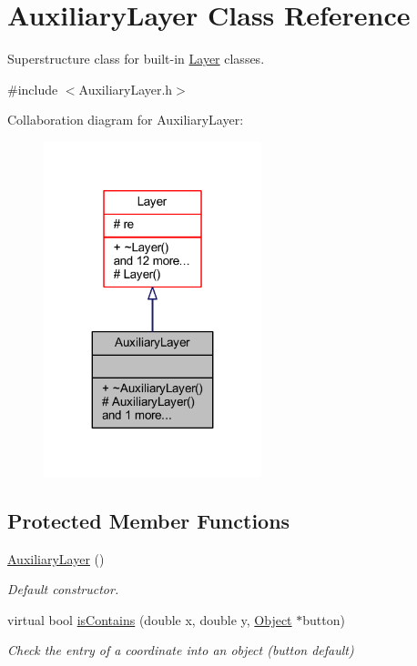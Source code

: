 \hypertarget{class_auxiliary_layer}{}\section{Auxiliary\+Layer Class Reference}
\label{class_auxiliary_layer}


Superstructure class for built-\/in \hyperlink{class_layer}{Layer} classes.  




{\ttfamily \#include $<$Auxiliary\+Layer.\+h$>$}



Collaboration diagram for Auxiliary\+Layer\+:
\nopagebreak
\begin{figure}[H]
\begin{center}
\leavevmode
\includegraphics[width=179pt]{class_auxiliary_layer__coll__graph}
\end{center}
\end{figure}
\subsection*{Protected Member Functions}
\begin{DoxyCompactItemize}
\item 
\mbox{\label{class_auxiliary_layer_a14a068a62e260548e70859a506a2fe7d}} 
\hyperlink{class_auxiliary_layer_a14a068a62e260548e70859a506a2fe7d}{Auxiliary\+Layer} ()
\begin{DoxyCompactList}\small\item\em Default constructor. \end{DoxyCompactList}\item 
virtual bool \hyperlink{class_auxiliary_layer_a2e8e6d2252aa08fc4e329b1301c52908}{is\+Contains} (double x, double y, \hyperlink{class_object}{Object} $\ast$button)
\begin{DoxyCompactList}\small\item\em Check the entry of a coordinate into an object (button default) \end{DoxyCompactList}\end{DoxyCompactItemize}
